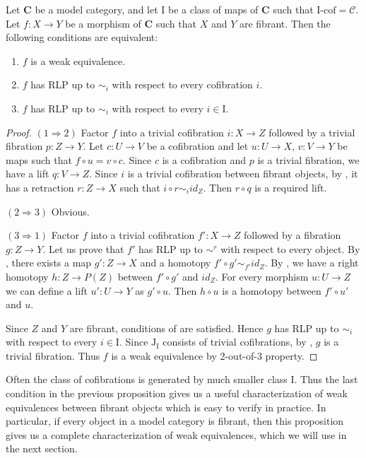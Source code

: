 \documentclass[reqno]{amsart}
\theoremstyle{definition}
\newcommand{\cof}{\mathcal{C}}
\newcommand{\cat}[1]{\mathbf{#1}}
\newcommand{\C}{\cat{C}}
\newcommand{\I}{\mathrm{I}}
\newcommand{\J}{\mathrm{J}}
\newcommand{\class}[2]{#1\text{-}\mathrm{#2}}
\newcommand{\Icof}[1][\I]{\class{#1}{cof}}
\begin{document}
\begin{prop}[min-we]
Let $\C$ be a model category, and let $\I$ be a class of maps of $\C$ such that $\Icof = \cof$.
Let $f : X \to Y$ be a morphism of $\C$ such that $X$ and $Y$ are fibrant.
Then the following conditions are equivalent:
\begin{enumerate}
\item $f$ is a weak equivalence.
\item $f$ has RLP up to $\sim_i$ with respect to every cofibration $i$.
\item $f$ has RLP up to $\sim_i$ with respect to every $i \in \I$.
\end{enumerate}
\end{prop}
\begin{proof}
$(1 \Rightarrow 2)$
Factor $f$ into a trivial cofibration $i : X \to Z$ followed by a trivial fibration $p : Z \to Y$.
Let $c : U \to V$ be a cofibration and let $u : U \to X$, $v : V \to Y$ be maps such that $f \circ u = v \circ c$.
Since $c$ is a cofibration and $p$ is a trivial fibration, we have a lift $q : V \to Z$.
Since $i$ is a trivial cofibration between fibrant objects, by , it has a retraction $r : Z \to X$ such that $i \circ r \sim_i id_Z$.
Then $r \circ q$ is a required lift.

$(2 \Rightarrow 3)$ Obvious.

$(3 \Rightarrow 1)$
Factor $f$ into a trivial cofibration $f' : X \to Z$ followed by a fibration $g : Z \to Y$.
Let us prove that $f'$ has RLP up to $\sim^r$ with respect to every object.
By , there exists a map $g' : Z \to X$ and a homotopy $f' \circ g' \sim_{f'} id_Z$.
By , we have a right homotopy $h : Z \to P(Z)$ between $f' \circ g'$ and $id_Z$.
For every morphism $u : U \to Z$ we can define a lift $u' : U \to Y$ as $g' \circ u$.
Then $h \circ u$ is a homotopy between $f' \circ u'$ and $u$.

Since $Z$ and $Y$ are fibrant, conditions of  are satisfied.
Hence $g$ has RLP up to $\sim_i$ with respect to every $i \in \I$.
Since $\J_\I$ consists of trivial cofibrations, by , $g$ is a trivial fibration.
Thus $f$ is a weak equivalence by 2-out-of-3 property.
\end{proof}

Often the class of cofibrations is generated by much smaller class $\I$.
Thus the last condition in the previous proposition gives us a useful characterization of weak equivalences between fibrant objects which is easy to verify in practice.
In particular, if every object in a model category is fibrant, then this proposition gives us a complete characterization of weak equivalences, which we will use in the next section.
\end{document}
